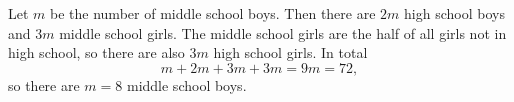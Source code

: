 Let $m$ be the number of middle school boys. Then there are $2m$ high school boys and $3m$ middle school girls. The middle school girls are the half of all girls not in high school, so there are also $3m$ high school girls. In total
\[
m+2m+3m+3m=9m=72,
\]
so there are $m=\boxed{8}$ middle school boys.
